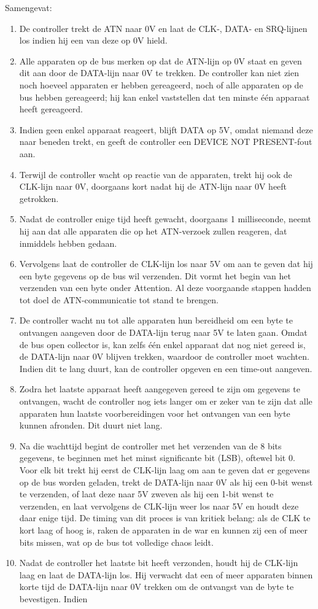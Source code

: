 Samengevat:

\begin{enumerate}
\item De controller trekt de ATN naar 0V en laat de CLK-, DATA- en SRQ-lijnen los indien hij een van deze op 0V hield.\item Alle apparaten op de bus merken op dat de ATN-lijn op 0V staat en geven dit aan door de DATA-lijn naar 0V te trekken. De controller kan niet zien noch hoeveel apparaten er hebben gereageerd, noch of alle apparaten op de bus hebben gereageerd; hij kan enkel vaststellen dat ten minste één apparaat heeft gereageerd.\item Indien geen enkel apparaat reageert, blijft DATA op 5V, omdat niemand deze naar beneden trekt, en geeft de controller een DEVICE NOT PRESENT-fout aan.\item Terwijl de controller wacht op reactie van de apparaten, trekt hij ook de CLK-lijn naar 0V, doorgaans kort nadat hij de ATN-lijn naar 0V heeft getrokken.\item Nadat de controller enige tijd heeft gewacht, doorgaans 1 milliseconde, neemt hij aan dat alle apparaten die op het ATN-verzoek zullen reageren, dat inmiddels hebben gedaan.\item Vervolgens laat de controller de CLK-lijn los naar 5V om aan te geven dat hij een byte gegevens op de bus wil verzenden. Dit vormt het begin van het verzenden van een byte onder Attention. Al deze voorgaande stappen hadden tot doel de ATN-communicatie tot stand te brengen.\item De controller wacht nu tot alle apparaten hun bereidheid om een byte te ontvangen aangeven door de DATA-lijn terug naar 5V te laten gaan. Omdat de bus open collector is, kan zelfs één enkel apparaat dat nog niet gereed is, de DATA-lijn naar 0V blijven trekken, waardoor de controller moet wachten. Indien dit te lang duurt, kan de controller opgeven en een time-out aangeven.\item Zodra het laatste apparaat heeft aangegeven gereed te zijn om gegevens te ontvangen, wacht de controller nog iets langer om er zeker van te zijn dat alle apparaten hun laatste voorbereidingen voor het ontvangen van een byte kunnen afronden. Dit duurt niet lang.\item Na die wachttijd begint de controller met het verzenden van de 8 bits gegevens, te beginnen met het minst significante bit (LSB), oftewel bit 0. Voor elk bit trekt hij eerst de CLK-lijn laag om aan te geven dat er gegevens op de bus worden geladen, trekt de DATA-lijn naar 0V als hij een 0-bit wenst te verzenden, of laat deze naar 5V zweven als hij een 1-bit wenst te verzenden, en laat vervolgens de CLK-lijn weer los naar 5V en houdt deze daar enige tijd. De timing van dit proces is van kritiek belang: als de CLK te kort laag of hoog is, raken de apparaten in de war en kunnen zij een of meer bits missen, wat op de bus tot volledige chaos leidt.\item Nadat de controller het laatste bit heeft verzonden, houdt hij de CLK-lijn laag en laat de DATA-lijn los. Hij verwacht dat een of meer apparaten binnen korte tijd de DATA-lijn naar 0V trekken om de ontvangst van de byte te bevestigen. Indien 
\end{enumerate}
